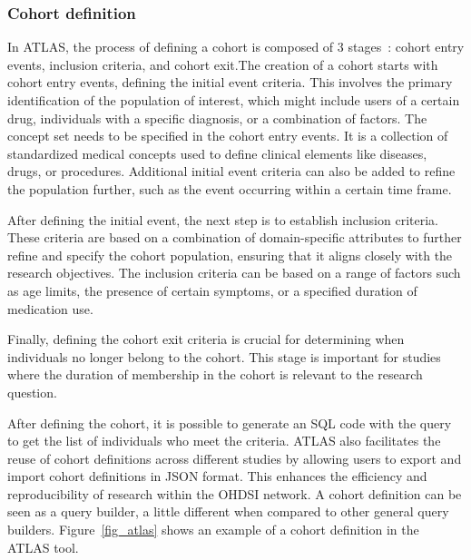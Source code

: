 \subsubsection{Cohort definition}

In ATLAS, the process of defining a cohort is composed of 3 stages~\cite{informatics_chapter_nodate}: cohort entry events, inclusion criteria, and cohort exit.The creation of a cohort starts with cohort entry events, defining the initial event criteria. This involves the primary identification of the population of interest, which might include users of a certain drug, individuals with a specific diagnosis, or a combination of factors. The concept set needs to be specified in the cohort entry events. It is a collection of standardized medical concepts used to define clinical elements like diseases, drugs, or procedures. Additional initial event criteria can also be added to refine the population further, such as the event occurring within a certain time frame.

After defining the initial event, the next step is to establish inclusion criteria. These criteria are based on a combination of domain-specific attributes to further refine and specify the cohort population, ensuring that it aligns closely with the research objectives. The inclusion criteria can be based on a range of factors such as age limits, the presence of certain symptoms, or a specified duration of medication use.

Finally, defining the cohort exit criteria is crucial for determining when individuals no longer belong to the cohort. This stage is important for studies where the duration of membership in the cohort is relevant to the research question.

After defining the cohort, it is possible to generate an SQL code with the query to get the list of individuals who meet the criteria. ATLAS also facilitates the reuse of cohort definitions across different studies by allowing users to export and import cohort definitions in JSON format. This enhances the efficiency and reproducibility of research within the OHDSI network. A cohort definition can be seen as a query builder, a little different when compared to other general query builders. Figure~\ref{fig_atlas} shows an example of a cohort definition in the ATLAS tool.


